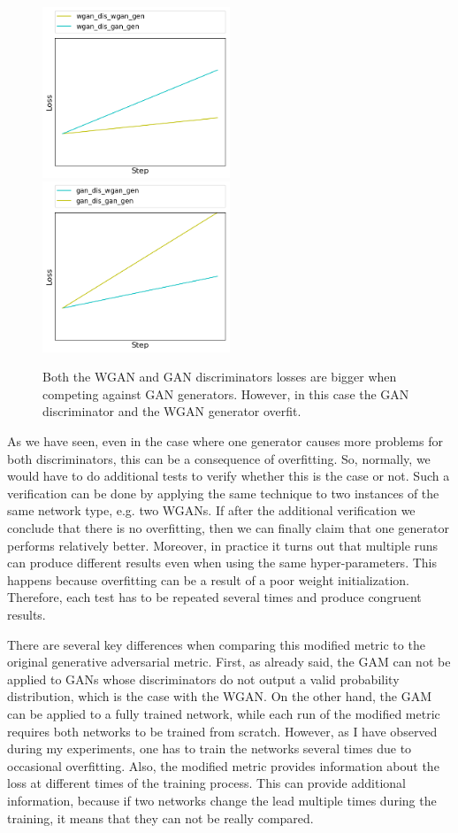 	\begin{figure}[h!] 
		\includegraphics[width=0.5\textwidth]{figures/ex/gen_dis_overfit_wgan_dis}
		\includegraphics[width=0.5\textwidth]{figures/ex/gen_dis_overfit_gan_dis}
		\caption{Both the WGAN and GAN discriminators losses are bigger when competing against GAN generators. However, in this case the GAN discriminator and the WGAN generator overfit.}
		\label{fig:cd_gen_dis_overfit}
	\end{figure}
As we have seen, even in the case where one generator causes more problems for both discriminators, this can be a consequence of overfitting. So, normally, we would have to do additional tests to verify whether this is the case or not. Such a verification can be done by applying the same technique to two instances of the same network type, e.g. two WGANs. If after the additional verification we conclude that there is no overfitting, then we can finally claim that one generator performs relatively better. Moreover, in practice it turns out that multiple runs can produce different results even when using the same hyper-parameters. This happens because overfitting can be a result of a poor weight initialization. Therefore, each test has to be repeated several times and produce congruent results. 

There are several key differences when comparing this modified metric to the original generative adversarial metric. First, as already said, the GAM can not be applied to GANs whose discriminators do not output a valid probability distribution, which is the case with the WGAN. On the other hand, the GAM can be applied to a fully trained network, while each run of the modified metric requires both networks to be trained from scratch. However, as I have observed during my experiments, one has to train the networks several times due to occasional overfitting. Also, the modified metric provides information about the loss at different times of the training process. This can provide additional information, because if two networks change the lead multiple times during the training, it means that they can not be really compared.  

